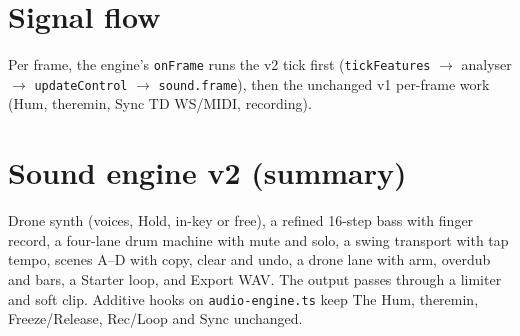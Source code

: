 \documentclass[10pt,a4paper]{article}
\newcommand{\code}[1]{\texttt{\small #1}}
\begin{document}
\section{Signal flow}
\begin{center}
\end{center}
Per frame, the engine's \code{onFrame} runs the v2 tick first (\code{tickFeatures} $\to$ analyser $\to$ \code{updateControl} $\to$ \code{sound.frame}),
then the unchanged v1 per-frame work (Hum, theremin, Sync TD WS/MIDI, recording).

\section{Sound engine v2 (summary)}
Drone synth (voices, Hold, in-key or free), a refined 16-step bass with finger record, a four-lane drum machine with mute and solo, a swing transport
with tap tempo, scenes A--D with copy, clear and undo, a drone lane with arm, overdub and bars, a Starter loop, and Export WAV. The output passes through a limiter
and soft clip. Additive hooks on \code{audio-engine.ts} keep The Hum, theremin, Freeze/Release, Rec/Loop and Sync unchanged.

\end{document}

